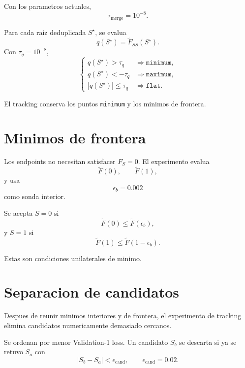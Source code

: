 \documentclass[11pt]{article}
\begin{document}
Con los parametros actuales,
\[
\tau_{\mathrm{merge}}=10^{-8}.
\]

Para cada raiz deduplicada \(S^\star\), se evalua
\[
q(S^\star)
=
\widetilde F_{SS}(S^\star).
\]
Con \(\tau_q=10^{-8}\),
\begin{equation}
\begin{cases}
q(S^\star)>\tau_q
&
\Rightarrow
\texttt{minimum},
\\
q(S^\star)<-\tau_q
&
\Rightarrow
\texttt{maximum},
\\
|q(S^\star)|\le\tau_q
&
\Rightarrow
\texttt{flat}.
\end{cases}
\label{eq:classification}
\end{equation}

El tracking conserva los puntos \texttt{minimum} y los minimos de frontera.

\section{Minimos de frontera}

Los endpoints no necesitan satisfacer \(F_S=0\). El experimento evalua
\[
\widetilde F(0),
\qquad
\widetilde F(1),
\]
y usa
\[
\epsilon_b=0.002
\]
como sonda interior.

Se acepta \(S=0\) si
\begin{equation}
\widetilde F(0)
\le
\widetilde F(\epsilon_b),
\label{eq:left-boundary}
\end{equation}
y \(S=1\) si
\begin{equation}
\widetilde F(1)
\le
\widetilde F(1-\epsilon_b).
\label{eq:right-boundary}
\end{equation}

Estas son condiciones unilaterales de minimo.

\section{Separacion de candidatos}

Despues de reunir minimos interiores y de frontera, el experimento de tracking
elimina candidatos numericamente demasiado cercanos.

Se ordenan por menor Validation-1 loss. Un candidato \(S_b\) se descarta si ya
se retuvo \(S_a\) con
\begin{equation}
|S_b-S_a|
<
\epsilon_{\mathrm{cand}},
\qquad
\epsilon_{\mathrm{cand}}=0.02.
\label{eq:candidate-spacing}
\end{equation}
\end{document}
